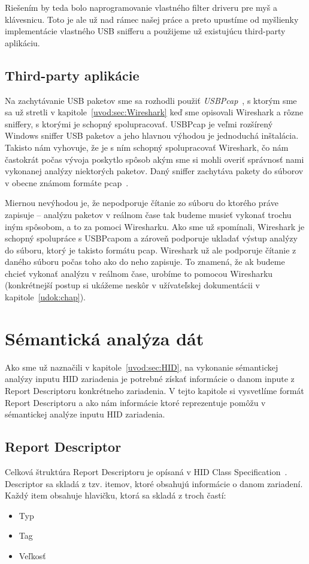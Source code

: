 Riešením by teda bolo naprogramovanie vlastného filter driveru pre myš a klávesnicu. Toto je ale už nad rámec našej práce a preto upustíme od myšlienky implementácie vlastného USB snifferu a použijeme už existujúcu third-party aplikáciu.

\subsection*{Third-party aplikácie}
\label{kap03:third_party}
Na zachytávanie USB paketov sme sa rozhodli použiť \textit{USBPcap}~\cite{usbpcap}, s ktorým sme sa už stretli v kapitole~\ref{uvod:sec:Wireshark} keď sme opisovali Wireshark a rôzne sniffery, s ktorými je schopný spolupracovať. USBPcap je veľmi rozšírený Windows sniffer USB paketov a jeho hlavnou výhodou je jednoduchá inštalácia. Takisto nám vyhovuje, že je s ním schopný spolupracovať Wireshark, čo nám častokrát počas vývoja poskytlo spôsob akým sme si mohli overiť správnosť nami vykonanej analýzy niektorých paketov. Daný sniffer zachytáva pakety do súborov v obecne známom formáte pcap~\cite{pcap}. 

Miernou nevýhodou je, že nepodporuje čítanie zo súboru do ktorého práve zapisuje -- analýzu paketov v reálnom čase tak budeme musieť vykonať trochu iným spôsobom, a to za pomoci Wiresharku. Ako sme už spomínali, Wireshark je schopný spolupráce s USBPcapom a zároveň podporuje ukladať výstup analýzy do súboru, ktorý je takisto formátu pcap. Wireshark už ale podporuje čítanie z daného súboru počas toho ako do neho zapisuje. To znamená, že ak budeme chcieť vykonať analýzu v reálnom čase, urobíme to pomocou Wiresharku (konkrétnejší postup si ukážeme neskôr v užívateľskej dokumentácii v kapitole~\ref{udok:chap}).



\section{Sémantická analýza dát}
Ako sme už naznačili v kapitole~\ref{uvod:sec:HID}, na vykonanie sémantickej analýzy inputu HID zariadenia je potrebné získať informácie o danom inpute z Report Descriptoru konkrétneho zariadenia. V tejto kapitole si vysvetlíme formát Report Descriptoru a ako nám informácie ktoré reprezentuje pomôžu v sémantickej analýze inputu HID zariadenia.

\subsection*{Report Descriptor}
\label{kap03:sec:report_desc}
Celková štruktúra Report Descriptoru je opísaná v HID Class Specification~\cite{report_desc}. Descriptor sa skladá z tzv. itemov, ktoré obsahujú informácie o danom zariadení. Každý item obsahuje hlavičku, ktorá sa skladá z troch častí:
\begin{itemize}
\item Typ
\item Tag
\item Veľkosť
\end{itemize}

